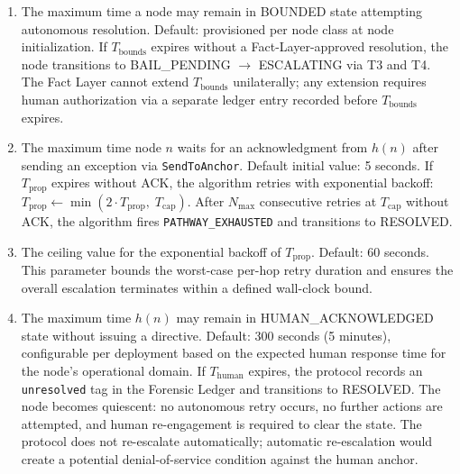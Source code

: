 \begin{enumerate}\itemsep=0pt
\item[\textbf{$T_{\text{bounds}}$ --- Bounds Engine resolution timeout.}] The maximum time a node may remain in BOUNDED state attempting autonomous resolution. Default: provisioned per node class at node initialization. If $T_{\text{bounds}}$ expires without a Fact-Layer-approved resolution, the node transitions to BAIL\_PENDING $\rightarrow$ ESCALATING via T3 and T4. The Fact Layer cannot extend $T_{\text{bounds}}$ unilaterally; any extension requires human authorization via a separate ledger entry recorded before $T_{\text{bounds}}$ expires.

\item[\textbf{$T_{\text{prop}}$ --- Propagation timeout.}] The maximum time node $n$ waits for an acknowledgment from $h(n)$ after sending an exception via \texttt{SendToAnchor}. Default initial value: 5 seconds. If $T_{\text{prop}}$ expires without ACK, the algorithm retries with exponential backoff: $T_{\text{prop}} \leftarrow \min(2 \cdot T_{\text{prop}},\; T_{\text{cap}})$. After $N_{\max}$ consecutive retries at $T_{\text{cap}}$ without ACK, the algorithm fires \texttt{PATHWAY\_EXHAUSTED} and transitions to RESOLVED.

\item[\textbf{$T_{\text{cap}}$ --- Maximum propagation timeout value.}] The ceiling value for the exponential backoff of $T_{\text{prop}}$. Default: 60 seconds. This parameter bounds the worst-case per-hop retry duration and ensures the overall escalation terminates within a defined wall-clock bound.

\item[\textbf{$T_{\text{human}}$ --- Human acknowledgment timeout.}] The maximum time $h(n)$ may remain in HUMAN\_ACKNOWLEDGED state without issuing a directive. Default: 300 seconds (5 minutes), configurable per deployment based on the expected human response time for the node's operational domain. If $T_{\text{human}}$ expires, the protocol records an \texttt{unresolved} tag in the Forensic Ledger and transitions to RESOLVED. The node becomes quiescent: no autonomous retry occurs, no further actions are attempted, and human re-engagement is required to clear the state. The protocol does not re-escalate automatically; automatic re-escalation would create a potential denial-of-service condition against the human anchor.
\end{enumerate}

